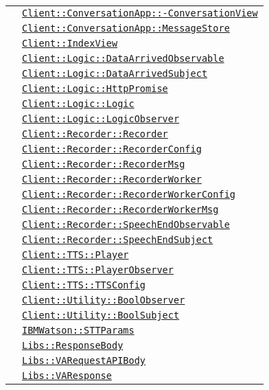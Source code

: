 \begin{longtable}{|>{\centering}m{3cm}|m{10cm}<{\centering}|}
& \hyperref[Client::ConversationApp::ConversationView]{\texttt{Client::ConversationApp::-\linebreak ConversationView}}\\
& \hyperref[Client::ConversationApp::MessageStore]{\texttt{Client::ConversationApp::MessageStore}}\\
& \hyperref[Client::IndexView]{\texttt{Client::IndexView}}\\
& \hyperref[Client::Logic::DataArrivedObservable]{\texttt{Client::Logic::DataArrivedObservable}}\\
& \hyperref[Client::Logic::DataArrivedSubject]{\texttt{Client::Logic::DataArrivedSubject}}\\
& \hyperref[Client::Logic::HttpPromise]{\texttt{Client::Logic::HttpPromise}}\\
& \hyperref[Client::Logic::Logic]{\texttt{Client::Logic::Logic}}\\
& \hyperref[Client::Logic::LogicObserver]{\texttt{Client::Logic::LogicObserver}}\\
& \hyperref[Client::Recorder::Recorder]{\texttt{Client::Recorder::Recorder}}\\
& \hyperref[Client::Recorder::RecorderConfig]{\texttt{Client::Recorder::RecorderConfig}}\\
& \hyperref[Client::Recorder::RecorderMsg]{\texttt{Client::Recorder::RecorderMsg}}\\
& \hyperref[Client::Recorder::RecorderWorker]{\texttt{Client::Recorder::RecorderWorker}}\\
& \hyperref[Client::Recorder::RecorderWorkerConfig]{\texttt{Client::Recorder::RecorderWorkerConfig}}\\
& \hyperref[Client::Recorder::RecorderWorkerMsg]{\texttt{Client::Recorder::RecorderWorkerMsg}}\\
& \hyperref[Client::Recorder::SpeechEndObservable]{\texttt{Client::Recorder::SpeechEndObservable}}\\
& \hyperref[Client::Recorder::SpeechEndSubject]{\texttt{Client::Recorder::SpeechEndSubject}}\\
& \hyperref[Client::TTS::Player]{\texttt{Client::TTS::Player}}\\
& \hyperref[Client::TTS::PlayerObserver]{\texttt{Client::TTS::PlayerObserver}}\\
& \hyperref[Client::TTS::TTSConfig]{\texttt{Client::TTS::TTSConfig}}\\
& \hyperref[Client::Utility::BoolObserver]{\texttt{Client::Utility::BoolObserver}}\\
& \hyperref[Client::Utility::BoolSubject]{\texttt{Client::Utility::BoolSubject}}\\
& \hyperref[IBMWatson::STTParams]{\texttt{IBMWatson::STTParams}}\\
& \hyperref[Libs::ResponseBody]{\texttt{Libs::ResponseBody}}\\
& \hyperref[Libs::VARequestAPIBody]{\texttt{Libs::VARequestAPIBody}}\\
& \hyperref[Libs::VAResponse]{\texttt{Libs::VAResponse}}\\ \hline


\end{longtable}
